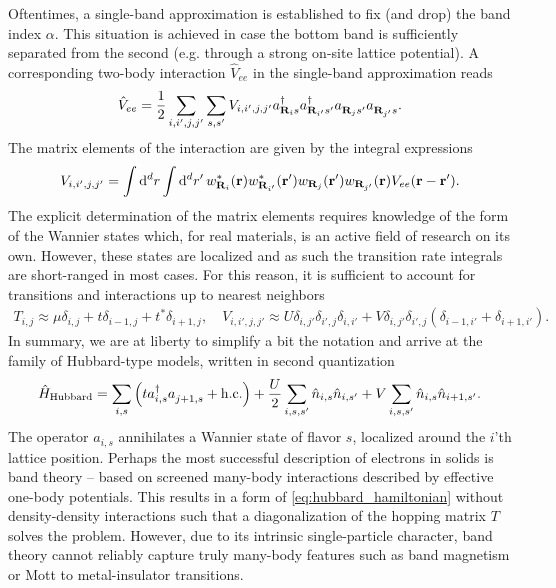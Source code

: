 Oftentimes, a single-band approximation is established to fix (and drop) the band index $\alpha$.
This situation is achieved in case the bottom band is sufficiently separated from the second (e.g. through a strong on-site lattice potential).
A corresponding two-body interaction $\hat V_{ee}$ in the single-band approximation reads
\begin{align}
    \hat V_{ee} = \frac12\sum_{i,i',j,j'}\sum_{s,s'}V_{i,i',j,j'}a^\dag_{{\bf R}_is}a^\dag_{{\bf R}_{i'}s'}a^\pdag_{{\bf R}_js'}a^\pdag_{{\bf R}_{j'}s}.
\end{align}
The matrix elements of the interaction are given by the integral expressions
\begin{align}
    V_{i,i',j,j'} = \int\mathrm d^dr\int\mathrm d^dr'\,w^*_{{\bf R}_i}({\bf r})w^*_{{\bf R}_{i'}}({\bf r}')w_{{\bf R}_j}({\bf r}')w_{{\bf R}_{j'}}({\bf r})V_{ee}({\bf r-r'}).
    \label{eq:two_body_interaction_transition_rates}
\end{align}
The explicit determination of the matrix elements requires knowledge of the form of the Wannier states which, for real materials, is an active field of research on its own.
However, these states are localized and as such the transition rate integrals are short-ranged in most cases.
For this reason, it is sufficient to account for transitions and interactions up to nearest neighbors
\begin{align}
    T_{i,j} \approx \mu\delta_{i,j} + t\delta_{i-1,j}+t^*\delta_{i+1,j},
    \quad
    V_{i,i',j,j'} \approx U\delta_{i,j'}\delta_{i',j}\delta_{i,i'} + V\delta_{i,j'}\delta_{i',j}(\delta_{i-1,i'}+\delta_{i+1,i'}).
\end{align}
In summary, we are at liberty to simplify a bit the notation and arrive at the family of Hubbard-type models, written in second quantization
\begin{align}
    \hat H_{\rm Hubbard} = \sum_{i,s}\brlr{t a^\dag_{i,s}a^\pdag_{j+1,s} + \hc} + \frac U2\sum_{i,s,s'}\hat n_{i,s}\hat n_{i,s'} + V\sum_{i,s,s'}\hat n_{i,s}\hat n_{i+1,s'}.
    \label{eq:hubbard_hamiltonian}
\end{align}
The operator $a_{i,s}$ annihilates a Wannier state of flavor $s$, localized around the $i$'th lattice position.
Perhaps the most successful description of electrons in solids is band theory -- based on screened many-body interactions described by effective one-body potentials.
This results in a form of \cref{eq:hubbard_hamiltonian} without density-density interactions such that a diagonalization of the hopping matrix $T$ solves the problem.
However, due to its intrinsic single-particle character, band theory cannot reliably capture truly many-body features such as band magnetism or Mott to metal-insulator transitions.
